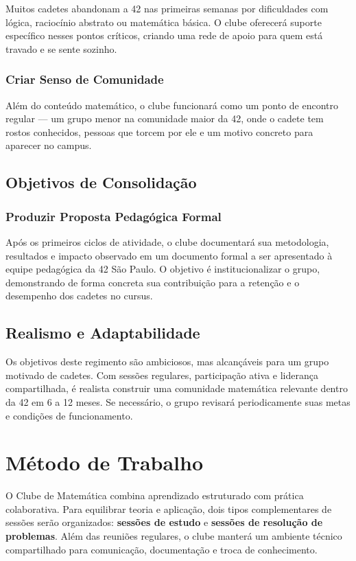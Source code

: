 \documentclass[12pt, a4paper]{article}
\begin{document}
Muitos cadetes abandonam a 42 nas primeiras semanas por dificuldades com lógica, raciocínio
abstrato ou matemática básica. O clube oferecerá suporte específico nesses pontos críticos,
criando uma rede de apoio para quem está travado e se sente sozinho.

\subsubsection{Criar Senso de Comunidade}

Além do conteúdo matemático, o clube funcionará como um ponto de encontro regular --- um
grupo menor na comunidade maior da 42, onde o cadete tem rostos conhecidos, pessoas
que torcem por ele e um motivo concreto para aparecer no campus.

\subsection{Objetivos de Consolidação}

\subsubsection{Produzir Proposta Pedagógica Formal}

Após os primeiros ciclos de atividade, o clube documentará sua metodologia, resultados e
impacto observado em um documento formal a ser apresentado à equipe pedagógica da 42 São
Paulo. O objetivo é institucionalizar o grupo, demonstrando de forma concreta sua
contribuição para a retenção e o desempenho dos cadetes no cursus.

\subsection{Realismo e Adaptabilidade}

Os objetivos deste regimento são ambiciosos, mas alcançáveis para um grupo motivado de
cadetes. Com sessões regulares, participação ativa e liderança compartilhada, é realista
construir uma comunidade matemática relevante dentro da 42 em 6 a 12 meses. Se necessário,
o grupo revisará periodicamente suas metas e condições de funcionamento.

\clearpage

\section{Método de Trabalho}

O Clube de Matemática combina aprendizado estruturado com prática colaborativa. Para
equilibrar teoria e aplicação, dois tipos complementares de sessões serão organizados:
\textbf{sessões de estudo} e \textbf{sessões de resolução de problemas}. Além das reuniões
regulares, o clube manterá um ambiente técnico compartilhado para comunicação, documentação
e troca de conhecimento.
\end{document}
